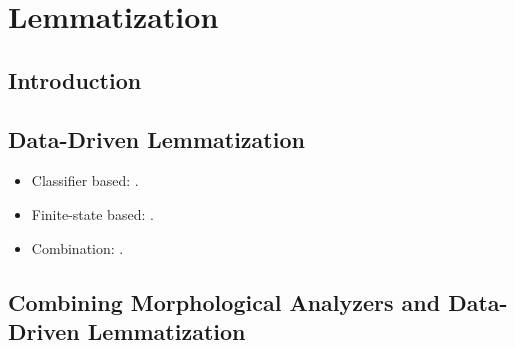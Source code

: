 \chapter{Lemmatization}
\section{Introduction}

\section{Data-Driven Lemmatization}
\begin{itemize}
\item Classifier based: \cite{Chrupala2008}.
\item Finite-state based: \cite{Linden2009}.
\item Combination: \cite{Hulden2014}.
\end{itemize}

\section{Combining Morphological Analyzers and Data-Driven Lemmatization}